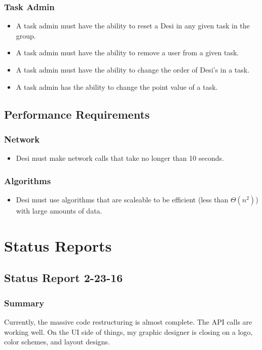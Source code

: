\documentclass[11pt, a4paper]{report}
\begin{document}
\subsection{Task Admin}
\begin{itemize}
\item A task admin must have the ability to reset a Desi in any given task in the group.
\item A task admin must have the ability to remove a user from a given task.
\item A task admin must have the ability to change the order of Desi's in a task.
\item A task admin has the ability to change the point value of a task.
\end{itemize}


\section{Performance Requirements}
\subsection{Network}
\begin{itemize}
\item Desi must make network calls that take no longer than 10 seconds.
\end{itemize}
\subsection{Algorithms}
\begin{itemize}
\item Desi must use algorithms that are scaleable to be efficient (less than $\Theta(n^2)$) with large amounts of data.
\end{itemize}

\chapter{Status Reports}
\section{Status Report 2-23-16}
\subsection{Summary}
Currently, the massive code restructuring is almost complete. The API calls are working well. On the UI side of things, my graphic designer is closing on a logo, color schemes, and layout designs.
\end{document}
